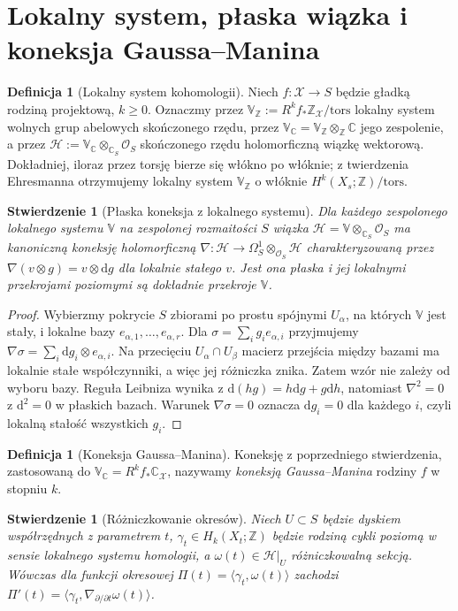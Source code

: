 \documentclass[11pt,a4paper,oneside]{report}
\newcommand{\C}{\mathbb{C}}
\newcommand{\Z}{\mathbb{Z}}
\newcommand{\dd}{\mathrm d}
\theoremstyle{plain}
\newtheorem{stwierdzenie}[twierdzenie]{Stwierdzenie}
\theoremstyle{definition}
\newtheorem{definicja}[twierdzenie]{Definicja}
\theoremstyle{remark}
\begin{document}
\section{Lokalny system, płaska wiązka i koneksja Gaussa--Manina}
\begin{definicja}[Lokalny system kohomologii]
Niech $f:\mathcal X\to S$ będzie gładką rodziną projektową,
$k\ge0$. Oznaczmy przez
$\mathbb V_{\Z}:=R^kf_*\Z_{\mathcal X}/\mathrm{tors}$
lokalny system wolnych grup abelowych skończonego rzędu,
przez $\mathbb V_{\C}=\mathbb V_{\Z}\otimes_{\Z}\C$
jego zespolenie, a przez
$\mathcal H:=\mathbb V_{\C}\otimes_{\C_S}\mathcal O_S$
skończonego rzędu holomorficzną wiązkę wektorową.
Dokładniej, iloraz przez torsję bierze się włókno po włóknie;
z twierdzenia Ehresmanna otrzymujemy lokalny system
$\mathbb V_{\Z}$ o włóknie $H^k(X_s;\Z)/\mathrm{tors}$.
\end{definicja}
\begin{stwierdzenie}[Płaska koneksja z lokalnego systemu]
\label{prop:xv-gm-local}
Dla każdego zespolonego lokalnego systemu $\mathbb V$ na
zespolonej rozmaitości $S$ wiązka
$\mathcal H=\mathbb V\otimes_{\C_S}\mathcal O_S$
ma kanoniczną koneksję holomorficzną
$\nabla:\mathcal H\to\Omega_S^1\otimes_{\mathcal O_S}\mathcal H$
charakteryzowaną przez $\nabla(v\otimes g)=v\otimes\dd g$
dla lokalnie stałego $v$. Jest ona płaska i jej lokalnymi
przekrojami poziomymi są dokładnie przekroje $\mathbb V$.
\end{stwierdzenie}
\begin{proof}
Wybierzmy pokrycie $S$ zbiorami po prostu spójnymi $U_\alpha$,
na których $\mathbb V$ jest stały, i lokalne bazy
$e_{\alpha,1},\dots,e_{\alpha,r}$. Dla
$\sigma=\sum_ig_ie_{\alpha,i}$ przyjmujemy
$\nabla\sigma=\sum_i\dd g_i\otimes e_{\alpha,i}$.
Na przecięciu $U_\alpha\cap U_\beta$ macierz przejścia
między bazami ma lokalnie stałe współczynniki, a więc
jej różniczka znika. Zatem wzór nie zależy od wyboru bazy.
Reguła Leibniza wynika z $\dd(hg)=h\dd g+g\dd h$,
natomiast $\nabla^2=0$ z $\dd^2=0$ w płaskich bazach.
Warunek $\nabla\sigma=0$ oznacza $\dd g_i=0$ dla każdego $i$,
czyli lokalną stałość wszystkich $g_i$.
\end{proof}
\begin{definicja}[Koneksja Gaussa--Manina]
Koneksję z poprzedniego stwierdzenia, zastosowaną do
$\mathbb V_{\C}=R^kf_*\C_{\mathcal X}$, nazywamy
\emph{koneksją Gaussa--Manina} rodziny $f$ w stopniu $k$.
\end{definicja}
\begin{stwierdzenie}[Różniczkowanie okresów]
\label{prop:xv-period-derivative}
Niech $U\subset S$ będzie dyskiem współrzędnych z parametrem $t$,
$\gamma_t\in H_k(X_t;\Z)$ będzie rodziną cykli poziomą
w sensie lokalnego systemu homologii, a
$\omega(t)\in\mathcal H|_U$ różniczkowalną sekcją.
Wówczas dla funkcji okresowej
$\Pi(t)=\langle\gamma_t,\omega(t)\rangle$
zachodzi
$\Pi'(t)=\langle\gamma_t,\nabla_{\partial/\partial t}\omega(t)\rangle$.
\end{stwierdzenie}
\end{document}
